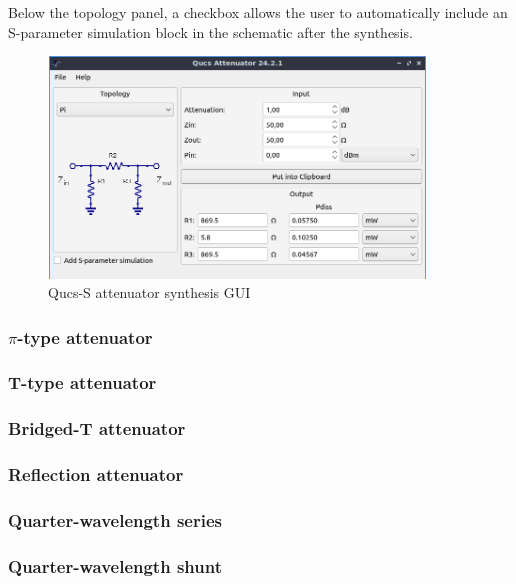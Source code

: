 \noindent Below the topology panel, a checkbox allows the user to automatically include an S-parameter simulation block in the schematic after the synthesis.

  \begin{figure}[ht]
    \centering
    \includegraphics[width=10cm]{./images/Qucs-S-attenuator-synthesis-GUI.png}
    \caption{Qucs-S attenuator synthesis GUI}
    \label{fig:qucs-s-attenuator-synthesis-GUI}
  \end{figure}

\clearpage
\subsubsection{$\pi$-type attenuator}
	

\clearpage
\subsubsection{T-type attenuator}
	

\clearpage
\subsubsection{Bridged-T attenuator}
	

\clearpage
\subsubsection{Reflection attenuator}
	

\clearpage
\subsubsection{Quarter-wavelength series}
	

\clearpage
\subsubsection{Quarter-wavelength shunt}
	

